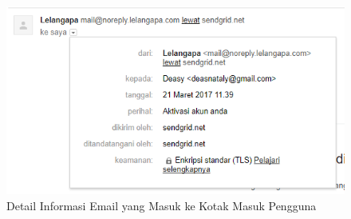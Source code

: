 	\indent 
	\begin{figure}[H]
		\centering
		\includegraphics[width=\textwidth]{images/bab4/pl/detail-whitelist.png}
		\caption{Detail Informasi Email yang Masuk ke Kotak Masuk Pengguna}
		\label{detail-whitelist}
	\end{figure}
	